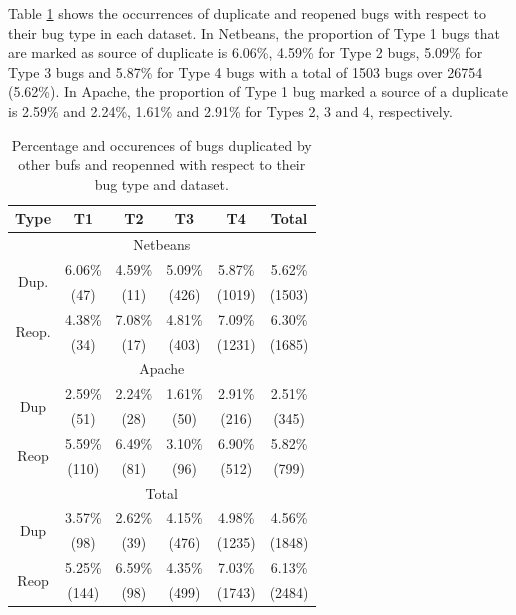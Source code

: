 Table \ref{tab:bug-taxo-rq2-dup} shows the occurrences of duplicate and reopened
bugs with respect to their bug type in each dataset. In
Netbeans, the proportion of Type 1 bugs that are marked as
source of duplicate is 6.06\%, 4.59\% for Type 2 bugs, 5.09\%
for Type 3 bugs and 5.87\% for Type 4 bugs with a total of
1503 bugs over 26754 (5.62\%). In Apache, the proportion of
Type 1 bug marked a source of a duplicate is 2.59\% and
2.24\%, 1.61\% and 2.91\% for Types 2, 3 and 4, respectively.

\begin{table}[h!]
\centering
\begin{tabular}{c|c|c|c|c|c}
Type                   & T1     & T2     & T3     & T4     & Total  \\ \hline \hline
\multicolumn{6}{c}{Netbeans}                                      \\ \hline \hline
\multirow{2}{*}{Dup.}  & 6.06\% & 4.59\% & 5.09\% & 5.87\% & 5.62\% \\
                       & (47)   & (11)   & (426)  & (1019) & (1503) \\ \hline
\multirow{2}{*}{Reop.} & 4.38\% & 7.08\% & 4.81\% & 7.09\% & 6.30\% \\
                       & (34)   & (17)   & (403)  & (1231) & (1685) \\ \hline
\multicolumn{6}{c}{Apache}                                        \\ \hline \hline
\multirow{2}{*}{Dup}   & 2.59\% & 2.24\% & 1.61\% & 2.91\% & 2.51\% \\ \
                       & (51)   & (28)   & (50)   & (216)  & (345)  \\ \hline
\multirow{2}{*}{Reop}  & 5.59\% & 6.49\% & 3.10\% & 6.90\% & 5.82\% \\
                       & (110)  & (81)   & (96)   & (512)  & (799)  \\ \hline
\multicolumn{6}{c}{Total}                                         \\ \hline \hline
\multirow{2}{*}{Dup}   & 3.57\% & 2.62\% & 4.15\% & 4.98\% & 4.56\% \\
                       & (98)   & (39)   & (476)  & (1235) & (1848) \\ \hline
\multirow{2}{*}{Reop}  & 5.25\% & 6.59\% & 4.35\% & 7.03\% & 6.13\% \\
                       & (144)  & (98)   & (499)  & (1743) & (2484) \\ \hline
\end{tabular}
\caption{Percentage and occurences of bugs duplicated by other bufs and reopenned with respect to their bug type and dataset.}
\label{tab:bug-taxo-rq2-dup}
\end{table}

